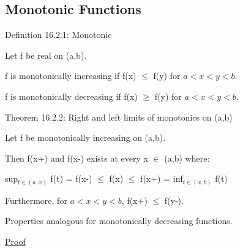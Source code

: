\subsection{ Monotonic Functions }

{ \color{blue} Definition 16.2.1: Monotonic }

    \begin{adjustbox}{minipage=14cm, right, vspace=0.1cm 0cm}
        Let f be real on (a,b).

        f is monotonically increasing if f(x) $\leq$ f(y) for $a < x < y < b$.

        f is monotonically decreasing if f(x) $\geq$ f(y) for $a < x < y < b$.
    \end{adjustbox}

    \vspace{0.5cm}

{ \color{red} Theorem 16.2.2: Right and left limits of monotonics on (a,b) }

    \begin{adjustbox}{minipage=14cm, right, vspace=0.1cm 0cm}
        Let f be monotonically increasing on (a,b).

        Then f(x+) and f(x-) exists at every x $\in$ (a,b) where:

        \hspace{1cm}
        sup$_{t \in (a,x)}$ f(t)
        = f(x-)
        $\leq$ f(x)
        $\leq$ f(x+)
        = inf$_{t \in (x,b)}$ f(t)

        Furthermore, for $a < x < y < b$, f(x+) $\leq$ f(y-).

        Properties analogous for monotonically decreasing functions.
    \end{adjustbox}

{ \color{magenta} \underline{Proof} }

